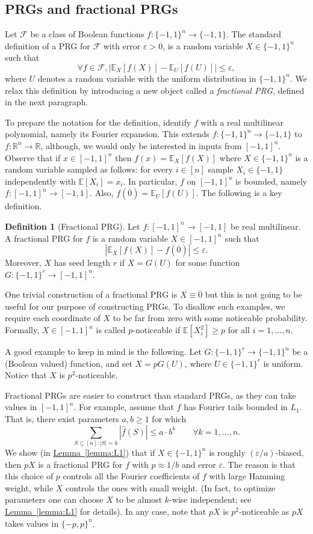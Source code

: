 \documentclass[11pt]{article}
\numberwithin{equation}{section}
\theoremstyle{definition}
\newtheorem{definition}[theorem]{Definition}
\theoremstyle{plain}
\newcommand{\R}{\mathbb R}
\newcommand{\expref}[2]{\hyperref[#2]{#1~\ref{#2}}}
\newcommand{\E}{\mathbb{E}}
\newcommand{\FF}{\mathcal{F}}
\newcommand{\eps}{\varepsilon}
\newcommand{\zero}{\overline{0}}
\begin{document}
\subsection{PRGs and fractional PRGs}
Let $\FF$ be a class of Boolean functions $f:\{-1,1\}^n \to \{-1,1\}$. The standard definition of a PRG for $\FF$ with error $\eps>0$,
is a random variable $X \in \{-1,1\}^n$ such that
$$
\forall f\in \FF, |\E_X[f(X)] - \E_U[f(U)]| \le \eps,
$$
where $U$ denotes a random variable with the uniform distribution in $\{-1,1\}^n$.  We relax this definition by introducing a new object called a \emph{fractional PRG}, defined in the next paragraph.

To prepare the notation for the definition, identify $f$ with a real multilinear polynomial, namely its Fourier expansion. This extends $f:\{-1,1\}^n\rightarrow \{-1,1\}$ to $f:\R^n \to \R$, although, we would only
be interested in inputs from $[-1,1]^n$. Observe that if $x \in [-1,1]^n$ then $f(x) = \E_X[f(X)]$ where $X \in \{-1,1\}^n$ is a random variable
sampled as follows: for every $i \in [n]$ sample $X_i \in \{-1,1\}$ independently with $\E[X_i]=x_i$.
In particular, $f$ on $[-1,1]^n$ is bounded, namely $f:[-1,1]^n \to [-1,1]$. Also, $f(\zero) = \E_U[f(U)]$. The following is a key definition.

\begin{definition}[Fractional PRG]
Let $f:[-1,1]^n \to [-1,1]$ be real multilinear. A fractional PRG for $f$ is a random variable $X \in [-1,1]^n$ such that
$$
|\E_X[f(X)] - f(\zero)| \le \eps.
$$
	Moreover, $X$ has seed length $r$ if $X = G(U)$ for some function $G:\{-1,1\}^r \to [-1,1]^n$.
\end{definition}

One trivial construction of a fractional PRG is $X\equiv \zero$ but this is not going to be useful for our purpose of constructing PRGs.
To disallow such examples, we require each coordinate of $X$ to be far from zero with some noticeable probability. Formally, $X \in [-1,1]^n$ is called $p$-noticeable
if $\E[X_i^2] \ge p$ for all $i=1,\ldots,n$.

A good example to keep in mind is the following. Let $G: \{ -1,1\}^r \rightarrow \{-1,1\}^{n}$ be a (Boolean valued) function,
and set $X=p G(U)$, where $U \in \{-1,1\}^r$ is uniform. Notice that $X$ is $p^2$-noticeable.
%
%

Fractional PRGs are easier to construct than standard PRGs, as they can take values in $[-1,1]^n$. For example, assume that $f$ has Fourier tails
bounded in $L_1$. That is,  there exist parameters $a,b \ge 1$ for which
$$
\sum_{S \subseteq [n]: |S|=k} |\hat{f}(S)| \le a \cdot b^k \qquad \forall k=1,\ldots,n.
$$
We show (in \expref{Lemma}{lemma:L1}) that if $X \in \{-1,1\}^n$ is roughly $(\eps/a)$-biased, then $pX$ is a fractional PRG for $f$ with $p \approx 1/b$ and error $\eps$. The reason is that
this choice of $p$ controls all the Fourier coefficients of $f$ with large Hamming weight, while $X$ controls the ones with small weight.
(In fact, to optimize parameters one can choose $X$ to be almost $k$-wise independent; see \expref{Lemma}{lemma:L1} for details).
In any case, note that $pX$ is $p^2$-noticeable as $pX$ takes values in $\{-p,p\}^n$.
\end{document}
